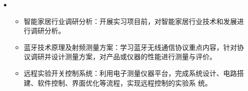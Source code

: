   \begin{itemize}[leftmargin=*]
    \item
      {\small
      \begin{itemize}
        \item 智能家居行业调研分析：开展实习项目前，对智能家居行业技术和发展进行调研分析。
        \item 蓝牙技术原理及射频测量方案：学习蓝牙无线通信协议重点内容，针对协议调研并设计测量方案，对产品或仪器的性能进行测量与评价。
        \item 远程实验开关控制系统：利用电子测量仪器平台，完成系统设计、电路搭建、软件控制、界面优化等流程，实现远程控制的实验系
        统。
      \end{itemize}
      }
  \end{itemize}